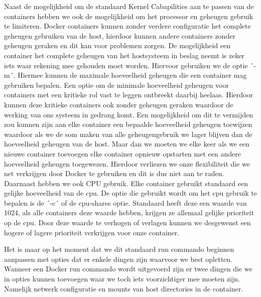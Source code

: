 Naast de mogelijkheid om de standaard Kernel Cabapilities aan te passen van de containers hebben we ook de mogelijkheid om het processor en geheugen gebruik te limiteren. Docker containers kunnen zonder verdere configuratie het complete geheugen gebruiken van de host, hierdoor kunnen andere containers zonder geheugen geraken en dit kan voor problemen zorgen. De mogelijkheid een container het complete geheugen van het hostsysteem in beslag neemt is zeker iets waar rekening mee gehouden moet worden. Hiervoor gebruiken we de optie ´-m´. Hiermee kunnen de maximale hoeveelheid geheugen die een container mag gebruiken bepalen. Een optie om de minimale hoeveelheid geheugen voor containers met een kritieke rol vast te leggen ontbreekt daarbij heelaas. Hierdoor kunnen deze kritieke containers ook zonder geheugen geraken waardoor de werking van ons systeem in gedrang komt. Een mogelijkheid om dit te vermijden zou kunnen zijn aan elke container een bepaalde hoeveelheid geheugen toewijzen waardoor als we de som maken van alle geheugengebruik we lager blijven dan de hoeveelheid geheugen van de host. Maar dan we moeten we elke keer als we een nieuwe container toevoegen elke container opnieuw opstarten met een andere hoeveelheid geheugen toegewezen. Hierdoor verliezen we onze flexibiliteit die we net verkrijgen door Docker te gebruiken en dit is dus niet aan te raden. Daarnaast hebben we ook CPU gebruik. Elke container gebruikt standaard een gelijke hoeveelheid van de cpu. De optie die gebruikt wordt om het cpu gebruik te bepalen is de ´-c´ of de cpu-shares optie. Standaard heeft deze een waarde van 1024, als alle containers deze waarde hebben, krijgen ze allemaal gelijke prioriteit op de cpu. Door deze waarde te verhogen of verlagen kunnen we desgewenst een hogere of lagere prioriteit verkrijgen voor onze container. 

Het is maar op het moment dat we dit standaard run commando beginnen aanpassen met opties dat er enkele dingen zijn waarvoor we best opletten. Wanneer een Docker run commando wordt uitgevoerd zijn er twee dingen die we in opties kunnen toevoegen waar we toch iets voorzichtiger mee moeten zijn. Namelijk netwerk configuratie en mounts van host directories in de container.

